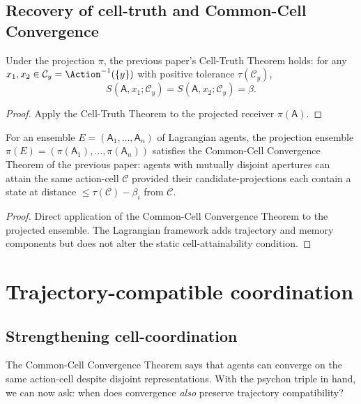 \documentclass[11pt,twocolumn,a4paper]{article}
\newcommand{\Cell}{\mathcal{C}}
\newcommand{\agent}{\mathsf{A}}
\begin{document}
\subsection{Recovery of cell-truth and Common-Cell Convergence}

\begin{theorem}\label{thm:cell-truth-rec}
Under the projection $\pi$, the previous paper's Cell-Truth Theorem
holds: for any $x_1,x_2\in\Cell_y=\Action^{-1}(\{y\})$ with positive
tolerance $\tau(\Cell_y)$,
\[
S(\agent,x_1;\Cell_y)=S(\agent,x_2;\Cell_y)=\beta.
\]
\end{theorem}

\begin{proof}
Apply the Cell-Truth Theorem to the projected receiver
$\pi(\agent)$.
\end{proof}

\begin{theorem}\label{thm:ccc-rec}
For an ensemble $E=(\agent_1,\dots,\agent_n)$ of Lagrangian agents,
the projection ensemble $\pi(E)=(\pi(\agent_1),\dots,\pi(\agent_n))$
satisfies the Common-Cell Convergence Theorem of the previous paper:
agents with mutually disjoint apertures can attain the same
action-cell $\Cell$ provided their candidate-projections each contain
a state at distance $\le\tau(\Cell)-\beta_i$ from $\Cell$.
\end{theorem}

\begin{proof}
Direct application of the Common-Cell Convergence Theorem to the
projected ensemble. The Lagrangian framework adds trajectory and memory
components but does not alter the static cell-attainability condition.
\end{proof}

\section{Trajectory-compatible coordination}
\label{sec:trajectory-coord}

\subsection{Strengthening cell-coordination}

The Common-Cell Convergence Theorem says that agents can converge on
the same action-cell despite disjoint representations. With the
psychon triple in hand, we can now ask: when does convergence
\emph{also} preserve trajectory compatibility?
\end{document}
